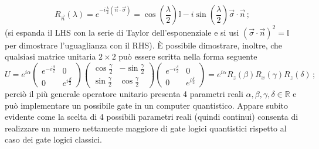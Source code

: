 \begin{equation}\label{rotation_n_lambda}
    R_{\vec{n}}(\lambda) = e^{-i \frac{\lambda}{2} (\vec n \cdot \vec \sigma)} = \cos \! \left( \frac{\lambda}{2} \right) \mathbb{I} - i \sin \! \left( \frac{\lambda}{2} \right) \vec \sigma \cdot \vec n \, ;
\end{equation}
(si espanda il LHS con la serie di Taylor dell'esponenziale e si usi $(\vec \sigma \cdot \vec n)^2 = \mathbb{I}$ per dimostrare l'uguaglianza con il RHS). È possibile dimostrare, inoltre, che qualsiasi matrice unitaria $2 \times 2$ può essere scritta nella forma seguente
\begin{equation}\label{general_2by2_matrix}
    U = e^{i \alpha}
    \begin{pmatrix}
        e^{-i \frac{\beta}{2}} & 0 \\ 0 & e^{i \frac{\beta}{2}}
    \end{pmatrix}
    \begin{pmatrix}
        \cos \frac{\gamma}{2} & - \sin \frac{\gamma}{2} \\ \sin  \frac{\gamma}{2} & \cos \frac{\gamma}{2}
    \end{pmatrix}
    \begin{pmatrix}
        e^{-i \frac{\delta}{2}} & 0 \\ 0 & e^{i \frac{\delta}{2}}
    \end{pmatrix}
    = e^{i \alpha} R_z(\beta) R_x(\gamma) R_z(\delta) \, ; 
\end{equation}
perciò il più generale operatore unitario presenta 4 parametri reali $\alpha, \beta, \gamma, \delta \in \mathbb{R}$ e può implementare un possibile gate in un computer quantistico. Appare subito evidente come la scelta di 4 possibili parametri reali (quindi continui) consenta di realizzare un numero nettamente maggiore di gate logici quantistici rispetto al caso dei gate logici classici. 